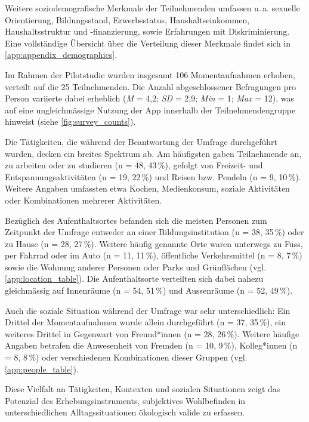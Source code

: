 Weitere soziodemografische Merkmale der Teilnehmenden umfassen u.\,a. sexuelle Orientierung, Bildungsstand, Erwerbsstatus, Haushaltseinkommen, Haushaltsstruktur und -finanzierung, sowie Erfahrungen mit Diskriminierung. Eine vollständige Übersicht über die Verteilung dieser Merkmale findet sich in \cref{app:appendix_demographics}.


Im Rahmen der Pilotstudie wurden insgesamt 106 Momentaufnahmen erhoben, verteilt auf die 25 Teilnehmenden. Die Anzahl abgeschlossener Befragungen pro Person variierte dabei erheblich (\textit{M} = 4{,}2; \textit{SD} = 2{,}9; \textit{Min} = 1; \textit{Max} = 12), was auf eine ungleichmässige Nutzung der App innerhalb der Teilnehmendengruppe hinweist (siehe \cref{fig:survey_counts}).

Die Tätigkeiten, die während der Beantwortung der Umfrage durchgeführt wurden, decken ein breites Spektrum ab. Am häufigsten gaben Teilnehmende an, zu arbeiten oder zu studieren (n = 48, 43\,\%), gefolgt von Freizeit- und Entspannungsaktivitäten (n = 19, 22\,\%) und Reisen bzw. Pendeln (n = 9, 10\,\%). Weitere Angaben umfassten etwa Kochen, Medienkonsum, soziale Aktivitäten oder Kombinationen mehrerer Aktivitäten.

Bezüglich des Aufenthaltsortes befanden sich die meisten Personen zum Zeitpunkt der Umfrage entweder an einer Bildungsinstitution (n = 38, 35\,\%) oder zu Hause (n = 28, 27\,\%). Weitere häufig genannte Orte waren unterwegs zu Fuss, per Fahrrad oder im Auto (n = 11, 11\,\%), öffentliche Verkehrsmittel (n = 8, 7\,\%) sowie die Wohnung anderer Personen oder Parks und Grünflächen (vgl. \cref{app:location_table}). Die Aufenthaltsorte verteilten sich dabei nahezu gleichmässig auf Innenräume (n = 54, 51\,\%) und Aussenräume (n = 52, 49\,\%).

Auch die soziale Situation während der Umfrage war sehr unterschiedlich: Ein Drittel der Momentaufnahmen wurde allein durchgeführt (n = 37, 35\,\%), ein weiteres Drittel in Gegenwart von Freund*innen (n = 28, 26\,\%). Weitere häufige Angaben betrafen die Anwesenheit von Fremden (n = 10, 9\,\%), Kolleg*innen (n = 8, 8\,\%) oder verschiedenen Kombinationen dieser Gruppen (vgl. \cref{app:people_table}).

Diese Vielfalt an Tätigkeiten, Kontexten und sozialen Situationen zeigt das Potenzial des Erhebungsinstruments, subjektives Wohlbefinden in unterschiedlichen Alltagssituationen ökologisch valide zu erfassen.



